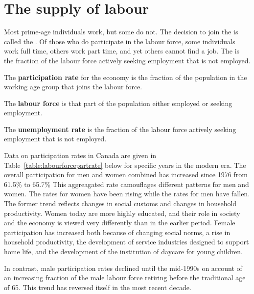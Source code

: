 \section{The supply of labour}\label{sec:ch12sec2}

Most prime-age individuals work, but some do not. The decision to join the %
 is called the . 
Of those who do participate in the labour force, some individuals work
full time, others work part time, and yet others cannot find a job. The %
 is the fraction of the labour force actively
seeking employment that is not employed.

\begin{DefBox}
The \textbf{participation rate} for the economy is the fraction of the population in the working age group that joins the labour force.

The \textbf{labour force} is that part of the population either employed or seeking employment.

The \textbf{unemployment rate} is the fraction of the labour force actively seeking employment that is not employed.
\end{DefBox}

\newhtmlpage

Data on participation rates in Canada are given in Table~\ref{table:labourforcepartrate} below for
specific years in the modern era. The overall participation for men and
women combined has increased since 1976 from 61.5\% to 65.7\% This
aggreagated rate camouflages different patterns for men and women. The rates
for women have been rising while the rates for men have fallen. The former
trend reflects changes in social customs and changes in household
productivity. Women today are more highly educated, and their role in
society and the economy is viewed very differently than in the earlier
period. Female participation has increased both because of changing social
norms, a rise in household productivity, the development of service
industries designed to support home life, and the development of the
institution of daycare for young children. 

In contrast, male participation rates declined until the mid-1990s on
account of an increasing fraction of the male labour force retiring before
the traditional age of 65. This trend has reversed itself in the most recent
decade. 

